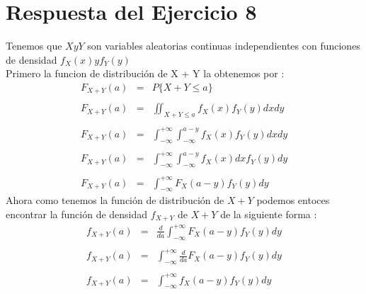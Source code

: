 \documentclass[12pt]{article}
\begin{document}
    \section*{Respuesta del Ejercicio 8} Tenemos que $ X y Y$ son variables aleatorias continuas independientes con funciones de densidad $f_{X}(x) y f_{Y}(y)$
    \\
    Primero la funcion de distribuci\'on de X + Y la obtenemos por : 
     \begin{equation*}
     \begin{array}{rcl}
     F_{X + Y}(a) & = & \displaystyle P\{X+Y \leq a\}
     \\
     \\
     F_{X + Y}(a) & = & \displaystyle\iint_{X+Y \leq a} f_X(x)f_Y(y)dxdy
     \\
     \\
     F_{X + Y}(a) & = & \displaystyle\int_{-\infty}^{+\infty}\int_{-\infty}^{a-y} f_X(x)f_Y(y)dxdy
     \\
     \\
     F_{X + Y}(a) & = & \displaystyle\int_{-\infty}^{+\infty}\int_{-\infty}^{a-y} f_X(x)dx f_Y(y)dy
     \\
     \\
     F_{X + Y}(a) & = & \displaystyle\int_{-\infty}^{+\infty} F_X(a-y) f_Y(y)dy
     \end{array}
     \end{equation*}
     Ahora como tenemos la funci\'on de distribuci\'on de $X+Y$ podemos entoces encontrar la funci\'on de densidad $f_{X+Y}$ de $ X+Y$ de la siguiente forma :
     \begin{equation*}
     \begin{array}{rcl}
     f_{X + Y}(a) & = & \displaystyle\frac{d}{da}\int_{-\infty}^{+\infty}F_X\left(a-y\right)f_Y(y)dy
     \\
     \\
     f_{X + Y}(a) & = & \displaystyle\int_{-\infty}^{+\infty}\frac{d}{da}F_X\left(a-y\right)f_Y(y)dy
     \\
     \\
     f_{X + Y}(a) & = & \int_{-\infty}^{+\infty}f_X\left(a-y\right)f_Y(y)dy
     \end{array}
     \end{equation*}
\end{document}
